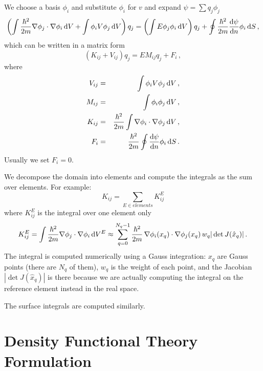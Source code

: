 We choose a basis $\phi_i$ and substitute $\phi_i$ for $v$ and expand $\psi=\sum q_j\phi_j$
\begin{equation}
  \left(\int{\hbar^2\over2m}\nabla\phi_j\cdot\nabla\phi_i\,{\rm d} V+ \int\phi_iV\phi_j\,{\rm d} V\right)q_j = \left(\int E\phi_j\phi_i\,{\rm d} V\right)q_j +\oint{\hbar^2\over2m}{{\rm d}\psi\over{\rm d}n}\phi_i\,{\rm d} S\,,  \label{fem}
\end{equation}
which can be written in a matrix form 
\begin{equation*}
  \left(K_{ij}+V_{ij}\right)q_j=EM_{ij}q_j+F_i\,,
\end{equation*}
where 
\begin{eqnarray*}
V_{ij}&=&\int\phi_iV\phi_j\,{\rm d} V\,, \\
M_{ij}&=&\int\phi_i\phi_j\,{\rm d} V\,, \\
K_{ij}&=&{\hbar^2\over2m}\int\nabla\phi_i\cdot\nabla\phi_j\,{\rm d} V\,, \\
F_i&=&{\hbar^2\over2m}\oint{{\rm d}\psi\over{\rm d}n}\phi_i\,{\rm d} S\,. \\
\end{eqnarray*}
 Usually we set $F_i=0$.

We decompose the domain into elements and compute the integrals as the sum over elements. For example: 
\begin{equation*}
  K_{ij}=\sum_{E\in elements} K_{ij}^E
\end{equation*}
where $K_{ij}^E$ is the integral over one element only 
\begin{equation*}
  K_{ij}^{E}=\int{\hbar^2\over2m}\nabla\phi_j\cdot\nabla\phi_i\,{\rm d} V^{E}\approx \sum_{q=0}^{N_q-1}{\hbar^2\over2m}\,\nabla\phi_i(x_q)\cdot\nabla\phi_j(x_q)\, w_q|\det J(\hat x_q)|\,.
\end{equation*}
The integral is computed numerically using a Gauss integration: $x_q$ are Gauss points (there are $N_q$ of them), $w_q$ is the weight of each point, and the Jacobian $|\det J(\hat x_q)|$ is there because we are actually computing the integral on the reference element instead in the real space.

The surface integrals are computed similarly.


\section{Density Functional Theory Formulation}

